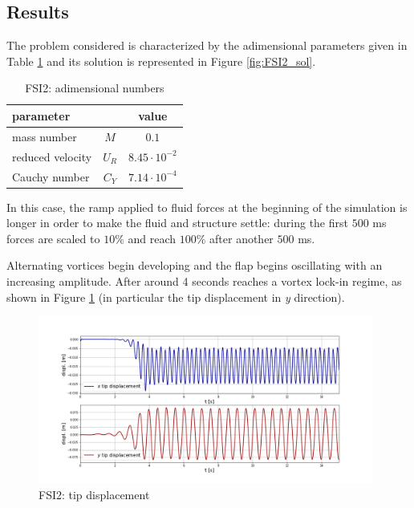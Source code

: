 \subsection{Results}

The problem considered is characterized by the adimensional parameters given in Table \ref{table:FSI2-adim} and its solution is represented in Figure \ref{fig:FSI2_sol}.

\begin{table}[!htb]
	\begin{center}
		\begin{tabular}{ l c | c } 
			parameter & & value   \\ 
			\hline
			mass number  & $M$ & $0.1$     \\
			reduced velocity & $U_R$ & $ 8.45\cdot 10^{-2}$  \\
			Cauchy number  & $C_Y$ & $  7.14 \cdot 10^{-4}$  \\			
		\end{tabular}
	\end{center}
	\caption{FSI2: adimensional numbers}
	\label{table:FSI2-adim}
\end{table}

In this case, the ramp applied to fluid forces at the beginning of the simulation is longer in order to make the fluid and structure settle: during the first $500$ \si{ms} forces are scaled to $10\%$ and reach $100\%$ after another $500$ \si{ms}.

Alternating vortices begin developing and the flap begins oscillating with an increasing amplitude. After around 4 seconds reaches a vortex lock-in regime, as shown in Figure \ref{fig:FSI2_displacement} (in particular the tip displacement in \textit{y} direction).


\begin{figure}[htbp!]
	\centering
	\includegraphics[width=0.98\textwidth, trim=20 20 50 50, clip]{images/FSI2/disp_fsi2.png}
	\caption{FSI2: tip displacement}
	\label{fig:FSI2_displacement}
\end{figure}

